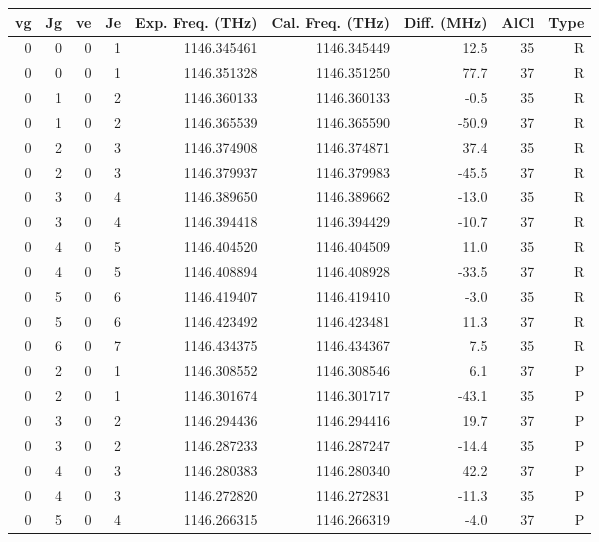 \begin{table}
\begin{tabu}{rrrrrrrrr}
\toprule
vg & Jg & ve & Je & Exp. Freq. (THz) & Cal. Freq. (THz) & Diff. (MHz) & AlCl & Type\\ \midrule 
\rowfont{\color{red}}0 & 0 & 0 & 1 & 1146.345461 & 1146.345449 & 12.5 & 35 & R\\
\rowfont{\color{red}}0 & 0 & 0 & 1 & 1146.351328 & 1146.351250 & 77.7 & 37 & R\\
\rowfont{\color{red}}0 & 1 & 0 & 2 & 1146.360133 & 1146.360133 & -0.5 & 35 & R\\
\rowfont{\color{red}}0 & 1 & 0 & 2 & 1146.365539 & 1146.365590 & -50.9 & 37 & R\\
\rowfont{\color{red}}0 & 2 & 0 & 3 & 1146.374908 & 1146.374871 & 37.4 & 35 & R\\
\rowfont{\color{red}}0 & 2 & 0 & 3 & 1146.379937 & 1146.379983 & -45.5 & 37 & R\\
\rowfont{\color{red}}0 & 3 & 0 & 4 & 1146.389650 & 1146.389662 & -13.0 & 35 & R\\
\rowfont{\color{red}}0 & 3 & 0 & 4 & 1146.394418 & 1146.394429 & -10.7 & 37 & R\\
\rowfont{\color{red}}0 & 4 & 0 & 5 & 1146.404520 & 1146.404509 & 11.0 & 35 & R\\
\rowfont{\color{red}}0 & 4 & 0 & 5 & 1146.408894 & 1146.408928 & -33.5 & 37 & R\\
\rowfont{\color{red}}0 & 5 & 0 & 6 & 1146.419407 & 1146.419410 & -3.0 & 35 & R\\
\rowfont{\color{red}}0 & 5 & 0 & 6 & 1146.423492 & 1146.423481 & 11.3 & 37 & R\\
\rowfont{\color{red}}0 & 6 & 0 & 7 & 1146.434375 & 1146.434367 & 7.5 & 35 & R\\
\rowfont{\color{blue}}0 & 2 & 0 & 1 & 1146.308552 & 1146.308546 & 6.1 & 37 & P\\
\rowfont{\color{blue}}0 & 2 & 0 & 1 & 1146.301674 & 1146.301717 & -43.1 & 35 & P\\
\rowfont{\color{blue}}0 & 3 & 0 & 2 & 1146.294436 & 1146.294416 & 19.7 & 37 & P\\
\rowfont{\color{blue}}0 & 3 & 0 & 2 & 1146.287233 & 1146.287247 & -14.4 & 35 & P\\
\rowfont{\color{blue}}0 & 4 & 0 & 3 & 1146.280383 & 1146.280340 & 42.2 & 37 & P\\
\rowfont{\color{blue}}0 & 4 & 0 & 3 & 1146.272820 & 1146.272831 & -11.3 & 35 & P\\
\rowfont{\color{blue}}0 & 5 & 0 & 4 & 1146.266315 & 1146.266319 & -4.0 & 37 & P\\

\end{tabu}
\end{table}
